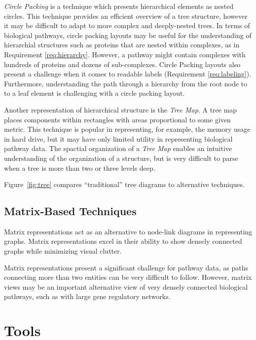 \documentclass[review,journal]{vgtc}         %
\begin{document}
\textit{Circle Packing} \cite{stephenson2005introduction} is a technique which presents hierarchical elements as nested circles. This technique provides an efficient overview of a tree structure, however it may be difficult to adapt to more complex and deeply-nested trees. In terms of biological pathways, circle packing layouts may be useful for the understanding of hierarchial structures such as proteins that are nested within complexes, as in Requirement \ref{req:hierarchy}. However, a pathway might contain complexes with hundreds of proteins and dozens of sub-complexes. Circle Packing layouts also present a challenge when it comes to readable labels (Requirement \ref{req:labeling}). Furthermore, understanding the path through a hierarchy from the root node to to a leaf element is challenging with a circle packing layout.

Another representation of hierarchical structure is the \textit{Tree Map}. A tree map places components within rectangles with areas proportional to some given metric. This technique is popular in representing, for example, the memory usage in hard drive, but it may have only limited utility in representing biological pathway data. The spactial organization of a \textit{Tree Map} enables an intuitive understanding of the organization of a structure, but is very difficult to parse when a tree is more than two or three levels deep.

Figure~\ref{fig:tree} compares ``traditional'' tree diagrams to alternative techniques.

\subsection{Matrix-Based Techniques}

Matrix representations act as an alternative to node-link diagrams in representing graphs. Matrix representations excel in their ability to show densely connected graphs while minimizing visual clutter.

Matrix representations present a significant challenge for pathway data, as paths connecting more than two entities can be very difficult to follow. However, matrix views may be an important alternative view of very densely connected biological pathways, such as with large gene regulatory networks.

\section{Tools}
\end{document}
